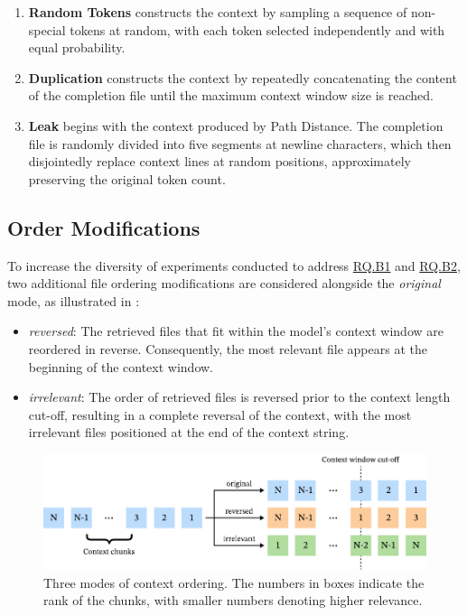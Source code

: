 \begin{enumerate}
    \item \textbf{Random Tokens} constructs the context by sampling a sequence of non-special tokens at random, with each token selected independently and with equal probability.
    \item \textbf{Duplication} constructs the context by repeatedly concatenating the content of the completion file until the maximum context window size is reached.
    \item \textbf{Leak} begins with the context produced by Path Distance. The completion file is randomly divided into five segments at newline characters, which then disjointedly replace context lines at random positions, approximately preserving the original token count.
\end{enumerate}\parencite{sapronov2025} %

\subsection{Order Modifications}

To increase the diversity of experiments conducted to address \hyperref[rq:rq-b1]{RQ.B1} and \hyperref[rq:rq-b2]{RQ.B2}, two additional file ordering modifications are considered alongside the \textit{original} mode, as illustrated in :

\begin{itemize}
    \item \textit{reversed}: The retrieved files that fit within the model's context window are reordered in reverse. Consequently, the most relevant file appears at the beginning of the context window.
    \item \textit{irrelevant}: The order of retrieved files is reversed prior to the context length cut-off, resulting in a complete reversal of the context, with the most irrelevant files positioned at the end of the context string.
\end{itemize}

\begin{figure}[ht]
    \centering
    \includegraphics[width=\textwidth]{figures/order-modes.pdf}
    \caption{Three modes of context ordering. The numbers in boxes indicate the rank of the chunks, with smaller numbers denoting higher relevance.}\label{fig:order-modes}
\end{figure}

